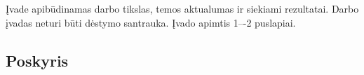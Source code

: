 \documentclass{article}
\begin{document}


Įvade apibūdinamas darbo tikslas, temos aktualumas ir siekiami rezultatai.
Darbo įvadas neturi būti dėstymo santrauka. Įvado apimtis 1–-2 puslapiai.




\subsection{Poskyris}
\end{document}
